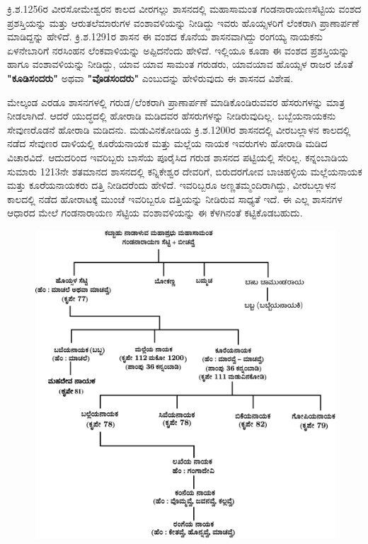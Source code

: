 ಕ್ರಿ.ಶ.1256ರ ವೀರಸೋಮೇಶ್ವರನ ಕಾಲದ ವೀರಗಲ್ಲು ಶಾಸನದಲ್ಲಿ ಮಹಾಸಾಮಂತ ಗಂಡನಾರಾಯಣಸೆಟ್ಟಿಯ ವಂಶದ ಪ್ರಶಸ್ತಿಯನ್ನು ಮತ್ತು ಆರುತಲೆಮಾರುಗಳ ವಂಶಾವಳಿಯನ್ನು ನೀಡಿದ್ದು ಇವರು ಹೊಯ್ಸಳರಿಗೆ ಲೆಂಕರಾಗಿ ಪ್ರಾಣಾರ್ಪಣೆ ಮಾಡಿದ್ದನ್ನು ಹೇಳಿದೆ. ಕ್ರಿ.ಶ.1291ರ ಶಾಸನ ಈ ವಂಶದ ಕೊನೆಯ ಶಾಸನವಾಗಿದ್ದು ರಂಗಯ್ಯ ನಾಯಕನು ಏಳನೇಬಾರಿಗೆ ನರಸಿಂಹನ ಲೆಂಕವಾಳಿಯನ್ನು ಅಪ್ಪಿದನೆಂದು ಹೇಳಿದೆ. ಇಲ್ಲಿಯೂ ಕೂಡಾ ಈ ವಂಶದ ಪ್ರಶಸ್ತಿಯನ್ನು ಹಾಗೂ ವಂಶಾವಳಿಯನ್ನು ನೀಡಿದ್ದು, ಯಾವ ಯಾವ ಸಾಮಂತ ಗರುಡರು, ಯಾವಯಾವ ಹೊಯ್ಸಳ ರಾಜರ ಜೊತೆ \textbf{"ಕೂಡಿಸಂದರು"} ಅಥವಾ \textbf{"ವೊಡಸಂದರು"} ಎಂಬುದನ್ನು ಹೇಳಿರುವುದು ಈ ಶಾಸನದ ವಿಶೇಷ.

ಮೇಲ್ಕಂಡ ಎರಡೂ ಶಾಸನಗಳಲ್ಲಿ ಗರುಡ/ಲೆಂಕರಾಗಿ ಪ್ರಾಣಾರ್ಪಣೆ ಮಾಡಿಕೊಂಡಿರುವವರ ಹೆಸರುಗಳನ್ನು ಮಾತ್ರ ನೀಡಲಾಗಿದೆ. ಆದರೆ ಯುದ್ಧದಲ್ಲಿ ಹೋರಾಡಿ ಮಡಿದವರ ಹೆಸರುಗಳನ್ನು ನೀಡಿರುವುದಿಲ್ಲ. ಬಬ್ಬೆಯನಾಯಕನು ಸೇವುಣರೊಡನೆ ಹೋರಾಡಿ ಮಡಿದನು. ಮಡುವಿನಕೋಡಿಯ ಕ್ರಿ.ಶ.1200ರ ಶಾಸನದಲ್ಲಿ ವೀರಬಲ್ಲಾಳನ ಕಾಲದಲ್ಲಿ ನಡೆದ ಸೇವುಣರ ದಾಳಿಯಲ್ಲಿ ಕೂರೆಯನಾಯಕ ಮತ್ತು ಮಲ್ಲೆಯ ನಾಯಕ ಇವರುಗಳು ಹೋರಾಡಿ ಮಡಿದ ವಿಚಾರವಿದೆ. ಆದುದರಿಂದ ಇವರಿಬ್ಬರು ಬಾಸೆಯ ಪೂರೈಸಿದ ಗರುಡ ಶಾಸನದ ಪಟ್ಟಿಯಲ್ಲಿ ಸೇರಿಲ್ಲ. ಕನ್ನಂಬಾಡಿಯ ಸುಮಾರು 12\enginline{-}13ನೇ ಶತಮಾನದ ಶಾಸನದಲ್ಲಿ ಕನ್ನಿಕೇಶ್ವರ ದೇವರಿಗೆ, ಬಿರುದರಗೋವ ಬಾಚಿಹಳ್ಳಿಯ ಮಲ್ಲೆಯನಾಯಕ ಮತ್ತು ಕೂರೆಯನಾಯಕರು ದತ್ತಿ ನೀಡಿದರೆಂದು ಹೇಳಿದೆ. ಇವರಿಬ್ಬರೂ ಅಣ್ಣತಮ್ಮಂದಿರಾಗಿದ್ದು, ವೀರಬಲ್ಲಾಳನ ಕಾಲದಲ್ಲಿ ನಡೆದ ಹೋರಾಟಕ್ಕೆ ಮುಂಚೆ ಇವರಿಬ್ಬರೂ ದತ್ತಿಯನ್ನು ನೀಡಿರುವ ಸಾಧ್ಯತೆ ಇದೆ. ಈ ಎಲ್ಲ ಶಾಸನಗಳ ಆಧಾರದ ಮೇಲೆ ಗಂಡನಾರಾಯಣ ಸೆಟ್ಟಿಯ ವಂಶಾವಳಿಯನ್ನು ಈ ಕೆಳಗಿನಂತೆ ಕಟ್ಟಿಕೊಡಬಹುದು.

\begin{figure}[!h]
\includegraphics[scale=1]{images/chap3/chap3fig4.jpeg}
\end{figure}

